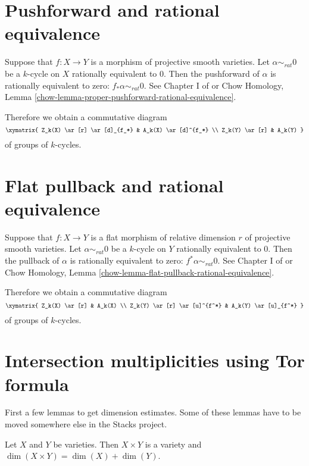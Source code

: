 \section{Pushforward and rational equivalence}
\label{section-pushforward-and-rational-equivalence}

\noindent
Suppose that $f : X \to Y$ is a morphism
of projective smooth varieties. 
Let $\alpha \sim_{rat} 0$ be a $k$-cycle on
$X$ rationally equivalent to $0$. Then the {pushforward}
of $\alpha$ is rationally equivalent to zero:
$f_* \alpha \sim_{rat} 0$. See Chapter I of \cite{F} or
Chow Homology, Lemma \ref{chow-lemma-proper-pushforward-rational-equivalence}.

\medskip\noindent
Therefore we obtain a commutative diagram
$$
\xymatrix{
Z_k(X) \ar[r] \ar[d]_{f_*} & A_k(X) \ar[d]^{f_*} \\
Z_k(Y) \ar[r] & A_k(Y)
}
$$
of groups of $k$-cycles.


\section{Flat pullback and rational equivalence}
\label{section-flat-pullback-and-rational-equivalence}

\noindent
Suppose that $f : X \to Y$ is a flat morphism of relative dimension $r$
of projective smooth varieties. 
Let $\alpha \sim_{rat} 0$ be a $k$-cycle on
$Y$ rationally equivalent to $0$. Then the pullback
of $\alpha$ is rationally equivalent to zero:
$f^* \alpha \sim_{rat} 0$. See Chapter I of \cite{F} or
Chow Homology, Lemma \ref{chow-lemma-flat-pullback-rational-equivalence}.

\medskip\noindent
Therefore we obtain a commutative diagram
$$
\xymatrix{
Z_k(X) \ar[r] & A_k(X) \\
Z_k(Y) \ar[r] \ar[u]^{f^*} & A_k(Y) \ar[u]_{f^*}
}
$$
of groups of $k$-cycles.


\section{Intersection multiplicities using Tor formula}
\label{section-tor-formula}

\noindent
First a few lemmas to get dimension estimates. Some of these lemmas have
to be moved somewhere else in the Stacks project.

\begin{lemma}
\label{lemma-dimension-product-varieties}
Let $X$ and $Y$ be varieties. Then $X \times Y$ is a variety and
$\dim(X \times Y) = \dim(X) + \dim(Y)$.
\end{lemma}

